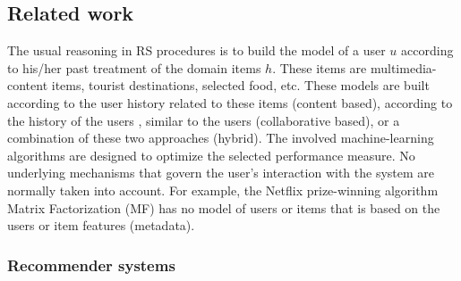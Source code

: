 \documentclass{llncs}
\begin{document}
\subsection{Related work}\label{SubSec_RelatedWork}

The usual reasoning in RS procedures is to build the model of a user $u$ according to his/her past treatment of the domain items $h$. These items are multimedia-content items, tourist destinations, selected food, etc. These models are built according to the user history related to these items (content based), according to the history of the users  , similar to the users   (collaborative based), or a combination of these two approaches (hybrid). The involved machine-learning algorithms are designed to optimize the selected performance measure. No underlying mechanisms that govern the user’s interaction with the system are normally taken into account. For example, the Netflix prize-winning algorithm Matrix Factorization (MF) has no model of users or items that is based on the users or item features (metadata).


\subsubsection{Recommender systems}\label{SubSubSec_RS}
\end{document}
